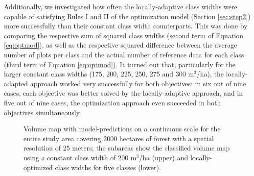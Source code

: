 Additionally, we investigated how often the locally-adaptive class widths were capable of satisfying Rules I and II of the optimization model (Section \ref{sec:step2}) more successfully than their constant class width counterparts. This was done by comparing the respective sum of squared class widths (second term of Equation \ref{eq:optmod}), as well as the respective squared difference between the average number of plots per class and the actual number of reference data for each class (third term of Equation \ref{eq:optmod}). It turned out that, particularly for the larger constant class widths (175, 200, 225, 250, 275 and 300 m$^3$/ha), the locally-adapted approach worked very successfully for both objectives: in six out of nine cases, each objective was better solved by the locally-adaptive approach, and in five out of nine cases, the optimization approach even succeeded in both objectives simultaneously.

\begin{figure}[H]
	\centering
	\caption{Volume map with model-predictions on a continuous scale for the entire study area covering 2000 hectares of forest with a spatial resolution of 25 meters; the subareas show the classified volume map using a constant class width of 200 m$^3$/ha (upper) and locally-optimized class widths for five classes (lower).}
	\label{fig:volmap}
\end{figure}


